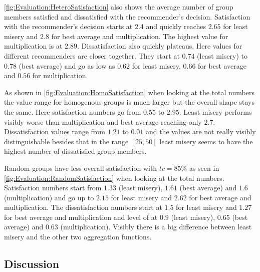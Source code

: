 \autoref{fig:Evaluation:HeteroSatisfaction} also shows the average number of group members satisfied and dissatisfied with the recommender's decision. Satisfaction with the recommender's decision starts at $2.4$ and quickly reaches $2.65$ for least misery and $2.8$ for best average and multiplication. The highest value for multiplication is at $2.89$. Dissatisfaction also  quickly plateaus. Here values for different recommenders are closer together. They start at $0.74$ (least misery) to $0.78$ (best average) and go as low as $0.62$ for least misery, $0.66$ for best average and $0.56$ for multiplication.

As shown in \autoref{fig:Evaluation:HomoSatisfaction} when looking at the total numbers the value range for homogenous groups is much larger but the overall shape stays the same. Here satisfaction numbers go from $0.55$ to $2.95$. Least misery performs visibly worse than multiplication and best average reaching only $2.7$. Dissatisfaction values range from $1.21$ to $0.01$ and the values are not really visibly distinguishable besides that in the range $[25,50]$ least misery seems to have the highest number of dissatisfied group members.

Random groups have less overall satisfaction with $tc = 85\%$ as seen in \autoref{fig:Evaluation:RandomSatisfaction} when looking at the total numbers. Satisfaction numbers start from $1.33$ (least misery), $1.61$ (best average) and $1.6$ (multiplication) and go up to $2.15$ for least misery and $2.62$ for best average and multiplication. The dissatisfaction numbers start at $1.5$ for least misery and $1.27$ for best average and multiplication and level of at $0.9$ (least misery), $0.65$ (best average) and $0.63$ (multiplication). Visibly there is a big difference between least misery and the other two aggregation functions.

\subsection{Discussion}

